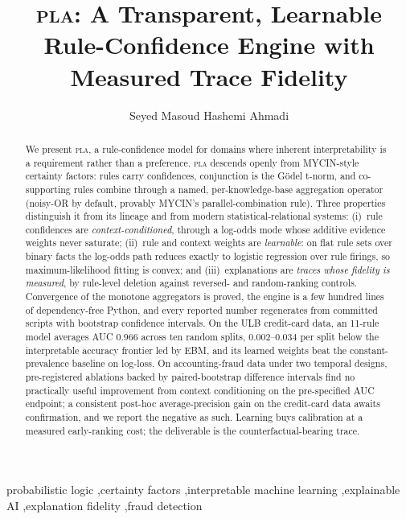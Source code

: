 \documentclass[review,12pt]{elsarticle}
\newcommand{\pla}{\textsc{pla}}
\begin{document}
\begin{frontmatter}

\title{\pla: A Transparent, Learnable Rule-Confidence Engine
with Measured Trace Fidelity}

\author[ets]{Seyed Masoud Hashemi Ahmadi}


\address[ets]{\'Ecole de technologie sup\'erieure (\'ETS), Montr\'eal, Canada}


\begin{abstract}
We present \pla{}, a rule-confidence model for domains where inherent
interpretability is a requirement rather than a preference. \pla{}
descends openly from MYCIN-style certainty factors: rules carry
confidences, conjunction is the G\"odel t-norm, and co-supporting
rules combine through a named, per-knowledge-base aggregation operator
(noisy-OR by default, provably MYCIN's parallel-combination rule).
Three properties distinguish it from its lineage and from modern
statistical-relational systems: (i)~rule confidences are
\emph{context-conditioned}, through a log-odds mode whose additive
evidence weights never saturate; (ii)~rule and context weights are
\emph{learnable}: on flat rule sets over binary facts the log-odds
path reduces exactly to logistic regression over rule firings, so
maximum-likelihood fitting is convex; and (iii)~explanations are
\emph{traces whose fidelity is measured}, by rule-level deletion
against reversed- and random-ranking controls. Convergence of the
monotone aggregators is proved, the engine is a few hundred lines of
dependency-free Python, and every reported number regenerates from
committed scripts with bootstrap confidence intervals. On the ULB
credit-card data, an 11-rule model averages AUC $0.966$ across ten
random splits, $0.002$–$0.034$ per split below the interpretable
accuracy frontier led by EBM, and its learned weights beat the
constant-prevalence baseline on log-loss. On accounting-fraud data
under two temporal designs, pre-registered ablations backed by
paired-bootstrap difference intervals find no practically useful
improvement from context conditioning on the pre-specified AUC
endpoint; a consistent post-hoc average-precision gain on the
credit-card data awaits confirmation, and we report the negative as
such. Learning buys calibration at a measured early-ranking cost; the
deliverable is the counterfactual-bearing trace.
\end{abstract}

\begin{keyword}
probabilistic logic \sep certainty factors \sep interpretable machine
learning \sep explainable AI \sep explanation fidelity \sep fraud
detection
\end{keyword}

\end{frontmatter}
\end{document}
